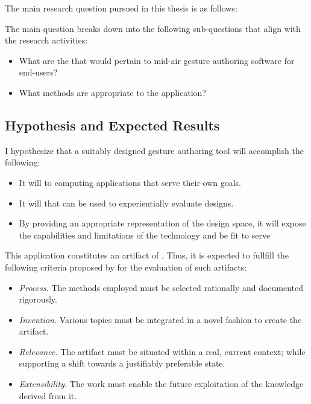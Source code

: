 The main research question pursued in this thesis is as follows:

\begin{center}
\end{center}

The main question breaks down into the following sub-questions that align with the research activities:

\begin{itemize}
\item What are the  that would pertain to mid-air gesture authoring software for end-users?
\item What methods are appropriate to  the application?
\end{itemize}

\subsection{Hypothesis and Expected Results} %

I hypothesize that a suitably designed gesture authoring tool will accomplish the following:

\begin{itemize}
\item It will  to computing applications that serve their own goals.
\item It will  that can be used to experientially evaluate designs.
\item By providing an appropriate representation of the design space, it will expose the capabilities and limitations of the technology and be fit to serve 
\end{itemize}

This application constitutes an artifact of  \parencite{Frayling:1993}. Thus, it is expected to fullfill the following criteria proposed by \textcite{Zimmerman:2007} for the evaluation of such artifacts:

\begin{itemize}
\item \emph{Process.} The methods employed must be selected rationally and documented rigorously.
\item \emph{Invention.} Various topics must be integrated in a novel fashion to create the artifact.
\item \emph{Relevance.} The artifact must be situated within a real, current context; while supporting a shift towards a justifiably preferable state.
\item \emph{Extensibility.} The work must enable the future exploitation of the knowledge derived from it.
\end{itemize}

